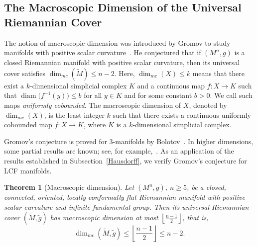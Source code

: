 \documentclass[12pt,oneside,a4paper]{article}
\theoremstyle{mytheorem}
\newtheorem{theorem}[definition]{Theorem}
\theoremstyle{remark}
\theoremstyle{definition}
\begin{document}
\subsection{The Macroscopic Dimension of the Universal Riemannian Cover}

The notion of macroscopic dimension was introduced by Gromov to study manifolds with positive scalar curvature~\cite{zbMATH00867495}. He conjectured that if $(M^n,g)$ is a closed Riemannian manifold with positive scalar curvature, then its universal cover satisfies
$\dim_{mc}(\widetilde M)\le n-2.$
Here, $\dim_{mc}(X)\le k$ means that there exist a $k$-dimensional simplicial complex $K$ and a continuous map $f:X\to K$ such that
$\operatorname{diam}\bigl(f^{-1}(y)\bigr)\le b$
for all $y\in K$ and for some constant $b>0$.  We call such maps \emph{uniformly cobounded}. The macroscopic dimension of $X$, denoted by $\dim_{mc}(X)$, is the least integer $k$ such that there exists a continuous uniformly cobounded map $f\colon X\to K$, where $K$ is a $k$-dimensional simplicial complex.

Gromov's conjecture is proved for $3$-manifolds by Bolotov~\cite{zbMATH01985808}. In higher dimensions, some partial results are known; see, for example,~\cite{zbMATH06371564,zbMATH08005926}. As an application of the results established in Subsection~\ref{Hausdorff}, we verify Gromov's conjecture for LCF manifolds.




\begin{theorem}[Macroscopic dimension]\label{macdim}
Let $(M^n,g)$, $n\geq5$, be a closed, connected, oriented, locally conformally flat Riemannian manifold with positive scalar curvature and infinite fundamental group. Then its universal Riemannian cover $(\widetilde M,\widetilde g)$ has macroscopic dimension at most $\left\lfloor\frac{n-1}{2}\right\rfloor$, that is,
\begin{equation*}
\dim_{mc}(\widetilde M,\widetilde g)
\le
\left\lfloor\frac{n-1}{2}\right\rfloor
\le
n-2.
\end{equation*}
\end{theorem}
\end{document}
